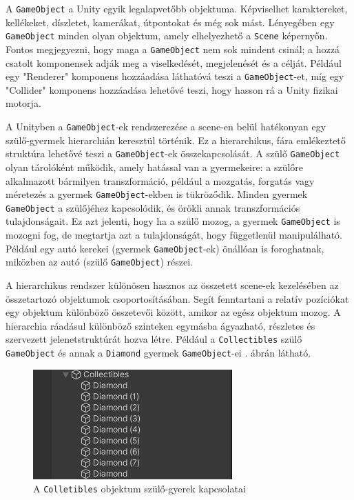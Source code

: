 A \texttt{GameObject} a Unity egyik legalapvetőbb objektuma. Képviselhet karaktereket, kellékeket, díszletet, kamerákat, útpontokat és még sok mást. Lényegében egy \texttt{GameObject} minden olyan objektum, amely elhelyezhető a \texttt{Scene} képernyőn. Fontos megjegyezni, hogy maga a \texttt{GameObject} nem sok mindent csinál; a hozzá csatolt komponensek adják meg a viselkedését, megjelenését és a célját. Például egy "Renderer" komponens hozzáadása láthatóvá teszi a \texttt{GameObject}-et, míg egy "Collider" komponens hozzáadása lehetővé teszi, hogy hasson rá a Unity fizikai motorja.\cite{unitygameobject}

A Unityben a \texttt{GameObject}-ek rendszerezése a scene-en belül hatékonyan egy szülő-gyermek hierarchián keresztül történik. Ez a hierarchikus, fára emlékeztető struktúra lehetővé teszi a \texttt{GameObject}-ek összekapcsolását. A szülő \texttt{GameObject} olyan tárolóként működik, amely hatással van a gyermekeire: a szülőre alkalmazott bármilyen transzformáció, például a mozgatás, forgatás vagy méretezés a gyermek \texttt{GameObject}-ekben is tükröződik. Minden gyermek \texttt{GameObject} a szülőjéhez kapcsolódik, és örökli annak transzformációs tulajdonságait. Ez azt jelenti, hogy ha a szülő mozog, a gyermek \texttt{GameObject} is mozogni fog, de megtartja azt a tulajdonságát, hogy függetlenül manipulálható. Például egy autó kerekei (gyermek \texttt{GameObject}-ek) önállóan is foroghatnak, miközben az autó (szülő \texttt{GameObject}) részei.\cite{unityhierarchy}

A hierarchikus rendszer különösen hasznos az összetett scene-ek kezelésében az összetartozó objektumok csoportosításában. Segít fenntartani a relatív pozíciókat egy objektum különböző összetevői között, amikor az egész objektum mozog. A hierarchia ráadásul különböző szinteken egymásba ágyazható, részletes és szervezett jelenetstruktúrát hozva létre.\cite{unityhierarchy} Például a \texttt{Collectibles} szülő \texttt{GameObject} és annak a \texttt{Diamond} gyermek \texttt{GameObject}-ei . ábrán látható.

\begin{figure}[ht]
\centering
\includegraphics[scale = 1.0]{images/hierarchia.png}
\caption{A \texttt{Colletibles} objektum szülő-gyerek kapcsolatai}
\label{fig:hierarchydiamond}
\end{figure}

